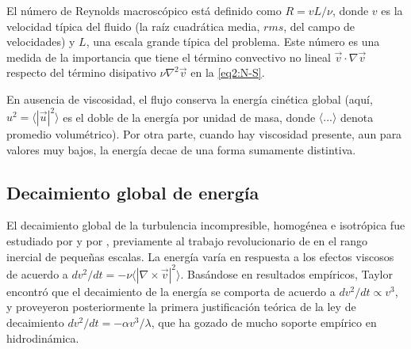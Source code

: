 El número de Reynolds macroscópico está definido como $R = vL/\nu$,
donde $v$ es la velocidad típica del fluido (la raíz cuadrática media,
$rms$, del campo de velocidades) y $L$, una escala grande típica del
problema. Este número es una medida de la importancia que
tiene el término convectivo no lineal $\vec{v}\cdot\nabla\vec{v}$
respecto del término disipativo $\nu\nabla^2 \vec{v}$ en la
\cref{eq2:N-S}.

En ausencia de viscosidad, el flujo conserva la energía cinética
global (aquí, $u^2 = \langle \left|\vec{u}\right|^2\rangle$ es el
doble de la energía por unidad de masa, donde $\langle ... \rangle$
denota promedio volumétrico). Por otra parte, cuando hay viscosidad
presente, aun para valores muy bajos, la energía decae de una forma
sumamente distintiva.


\subsection{Decaimiento global de energía}

El decaimiento global de la turbulencia incompresible, homogénea e
isotrópica fue estudiado por \cite{taylor_statistical_1935,
taylor_spectrum_1938} y por \cite{von_karman_statistical_1938},
previamente al trabajo revolucionario de
\cite{kolmogorov_local_1941,kolmogorov_decay_1941} en el rango
inercial de pequeñas escalas. La energía varía en respuesta a los
efectos viscosos de acuerdo a $dv^2/dt = -\nu
\langle\left|\nabla\times\vec{v}\right|^2\rangle$. Basándose en
resultados empíricos, Taylor encontró que el decaimiento de la energía
se comporta de acuerdo a $dv^2/dt \propto v^3$, y
\cite{von_karman_statistical_1938} proveyeron posteriormente la
primera justificación teórica de la ley de decaimiento $dv^2/dt =
-\alpha v^3/\lambda$, que ha gozado de mucho soporte empírico en
hidrodinámica.

